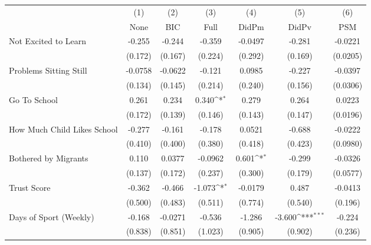 {
\def\sym#1{\ifmmode^{#1}\else\(^{#1}\)\fi}
\begin{tabular}{l*{6}{c}}
\toprule
            &\multicolumn{1}{c}{(1)}&\multicolumn{1}{c}{(2)}&\multicolumn{1}{c}{(3)}&\multicolumn{1}{c}{(4)}&\multicolumn{1}{c}{(5)}&\multicolumn{1}{c}{(6)}\\
            &\multicolumn{1}{c}{None}&\multicolumn{1}{c}{BIC}&\multicolumn{1}{c}{Full}&\multicolumn{1}{c}{DidPm}&\multicolumn{1}{c}{DidPv}&\multicolumn{1}{c}{PSM}\\
\midrule
Not Excited to Learn&      -0.255         &      -0.244         &      -0.359         &     -0.0497         &      -0.281         &     -0.0221         \\
            &     (0.172)         &     (0.167)         &     (0.224)         &     (0.292)         &     (0.169)         &    (0.0205)         \\
\addlinespace
Problems Sitting Still&     -0.0758         &     -0.0622         &      -0.121         &      0.0985         &      -0.227         &     -0.0397         \\
            &     (0.134)         &     (0.145)         &     (0.214)         &     (0.240)         &     (0.156)         &    (0.0306)         \\
\addlinespace
Go To School&       0.261         &       0.234         &       0.340\sym{*}  &       0.279         &       0.264         &      0.0223         \\
            &     (0.172)         &     (0.139)         &     (0.146)         &     (0.143)         &     (0.147)         &    (0.0196)         \\
\addlinespace
How Much Child Likes School&      -0.277         &      -0.161         &      -0.178         &      0.0521         &      -0.688         &     -0.0222         \\
            &     (0.410)         &     (0.400)         &     (0.380)         &     (0.418)         &     (0.423)         &    (0.0980)         \\
\addlinespace
Bothered by Migrants&       0.110         &      0.0377         &     -0.0962         &       0.601\sym{*}  &      -0.299         &     -0.0326         \\
            &     (0.137)         &     (0.172)         &     (0.237)         &     (0.300)         &     (0.179)         &    (0.0577)         \\
\addlinespace
Trust Score &      -0.362         &      -0.466         &      -1.073\sym{*}  &     -0.0179         &       0.487         &     -0.0413         \\
            &     (0.500)         &     (0.483)         &     (0.511)         &     (0.774)         &     (0.540)         &     (0.196)         \\
\addlinespace
Days of Sport (Weekly)&      -0.168         &     -0.0271         &      -0.536         &      -1.286         &      -3.600\sym{***}&      -0.224         \\
            &     (0.838)         &     (0.851)         &     (1.023)         &     (0.905)         &     (0.902)         &     (0.236)         \\
\bottomrule
\end{tabular}
}
